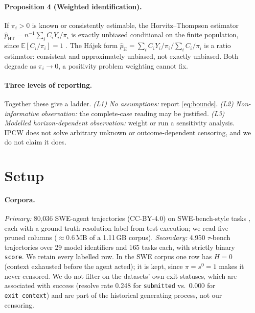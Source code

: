 \documentclass[letterpaper]{article}
\begin{document}
\paragraph{Proposition 4 (Weighted identification).}
If $\pi_i>0$ is known or consistently estimable, the Horvitz--Thompson
estimator $\hat p_{\mathrm{HT}}=n^{-1}\sum_i C_iY_i/\pi_i$ is exactly unbiased
conditional on the finite population, since $\mathbb{E}[C_i/\pi_i]=1$
\citep{horvitz1952generalization,robins1994estimation}. The H\'ajek form
$\hat p_{\mathrm{H}}=\sum_i C_iY_i/\pi_i\big/\sum_i C_i/\pi_i$ is a ratio
estimator: consistent and approximately unbiased, not exactly unbiased. Both
degrade as $\pi_i\to0$, a positivity problem weighting cannot fix.

\paragraph{Three levels of reporting.} Together these give a ladder.
\emph{(L1) No assumptions:} report \eqref{eq:bounds}.
\emph{(L2) Non-informative observation:} the complete-case reading may be
justified. \emph{(L3) Modelled horizon-dependent observation:} weight or run a
sensitivity analysis. IPCW does not solve arbitrary unknown or
outcome-dependent censoring, and we do not claim it does.

\section{Setup}
\label{sec:setup}

\paragraph{Corpora.} \emph{Primary:} 80{,}036 SWE-agent
\citep{yang2024sweagent} trajectories \citep{nebius2025trajectories}
(CC-BY-4.0) on SWE-bench-style tasks
\citep{jimenez2024swebench,openai2024swebenchverified}, each with a
ground-truth resolution label from test execution; we read five pruned columns
($\approx$0.6\,MB of a 1.11\,GB corpus).
\emph{Secondary:} 4{,}950 $\tau$-bench trajectories
\citep{agentsuite2026taubench,yao2024taubench} over 29 model identifiers and
165 tasks each, with strictly binary \texttt{score}. We retain every labelled
row. In the SWE corpus one row has $H=0$ (context exhausted before the agent
acted); it is kept, since $\pi=s^{0}=1$ makes it never censored. We do not
filter on the datasets' own exit statuses, which are associated with success
(resolve rate 0.248 for \texttt{submitted} vs.\ 0.000 for
\texttt{exit\_context}) and are part of the historical generating process, not
our censoring.
\end{document}
